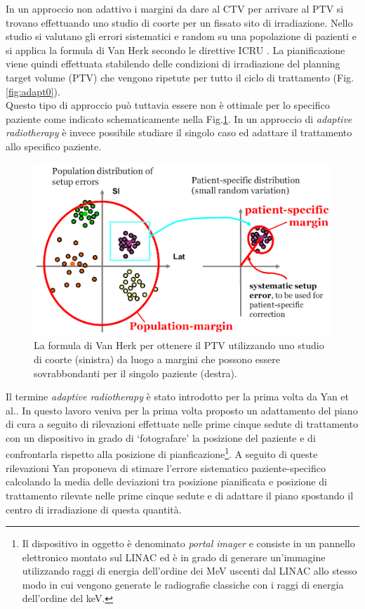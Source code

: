 In un approccio non adattivo i margini da dare al CTV per arrivare al PTV si trovano effettuando uno studio di coorte per un fissato sito di irradiazione. Nello studio si valutano gli errori sistematici e random su una popolazione di pazienti e si applica la formula di Van Herk secondo le direttive ICRU \cite{ICRU62}. La pianificazione viene quindi effettuata stabilendo delle condizioni di irradiazione del planning target volume (PTV)  che vengono ripetute per tutto il ciclo di trattamento (Fig.\ref{fig:adapt0}).\\
Questo tipo di approccio può tuttavia essere non è ottimale per lo specifico paziente come indicato schematicamente nella Fig.\ref{fig:margins}. In un approccio di \textit{adaptive radiotherapy} è invece possibile studiare il singolo caso ed adattare il trattamento allo specifico paziente.
\begin{figure}
\centering
\includegraphics[width=.8\textwidth]{./cap3/margins.png}
\caption{La formula di Van Herk per ottenere il PTV utilizzando uno studio di coorte (sinistra) da luogo a margini che possono essere sovrabbondanti per il singolo paziente (destra).}
\label{fig:margins}
\end{figure}

Il termine \textit{adaptive radiotherapy} è stato introdotto per la prima volta  da Yan et al.\cite{Yan1996}. In questo lavoro veniva per la prima volta proposto un adattamento del piano di cura a seguito di rilevazioni effettuate nelle prime cinque sedute di trattamento con un dispositivo in grado di `fotografare' la posizione del paziente e di confrontarla rispetto alla posizione di pianficazione\footnote{Il dispositivo in oggetto è denominato \textit{portal imager} e consiste in un pannello elettronico montato sul LINAC ed è in grado di generare un'immagine utilizzando raggi di energia dell'ordine dei MeV uscenti dal LINAC allo stesso modo in cui vengono generate le radiografie classiche con i raggi di energia dell'ordine del keV.}. A seguito di queste rilevazioni Yan proponeva di stimare l'errore sistematico paziente-specifico calcolando la media delle deviazioni tra posizione pianificata e posizione di trattamento rilevate nelle prime cinque sedute e di adattare il piano spostando il centro di irradiazione di questa quantità.

